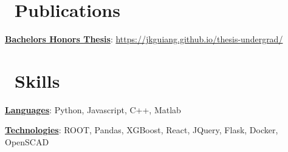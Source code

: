 \documentclass[letterpaper,11pt]{article}
\newcommand{\Item}[3]{
  \item\small{
    \textbf{\href{#1}{#2}}{: #3 \vspace{-2pt}}
  }
}
\newcommand{\SubItem}[3]{\Item{#1}{#2}{#3}\vspace{-4pt}}
\newcommand{\SubHeadingListStart}{\begin{description}[leftmargin=*]}
\newcommand{\SubHeadingListEnd}{\end{description}}
\begin{document}
\section{\faPencilSquareO\ Publications}
  \SubHeadingListStart
    \SubItem{https://www.physics.ucsb.edu/education/undergrad/department-honors}{Bachelors Honors Thesis}
      {\href{https://jkguiang.github.io/thesis-undergrad/}{https://jkguiang.github.io/thesis-undergrad/}}
  \SubHeadingListEnd
%

\section{\faSliders\ Skills}
 \SubHeadingListStart
    \SubItem{}{Languages}{Python, Javascript, C++, Matlab}
    \SubItem{}{Technologies}{ROOT, Pandas, XGBoost, React, JQuery, Flask, Docker, OpenSCAD}

 \SubHeadingListEnd
%

\end{document}
